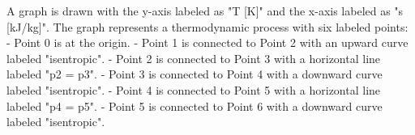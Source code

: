 A graph is drawn with the y-axis labeled as "T [K]" and the x-axis labeled as "s [kJ/kg]". The graph represents a thermodynamic process with six labeled points:  
- Point 0 is at the origin.  
- Point 1 is connected to Point 2 with an upward curve labeled "isentropic".  
- Point 2 is connected to Point 3 with a horizontal line labeled "p2 = p3".  
- Point 3 is connected to Point 4 with a downward curve labeled "isentropic".  
- Point 4 is connected to Point 5 with a horizontal line labeled "p4 = p5".  
- Point 5 is connected to Point 6 with a downward curve labeled "isentropic".